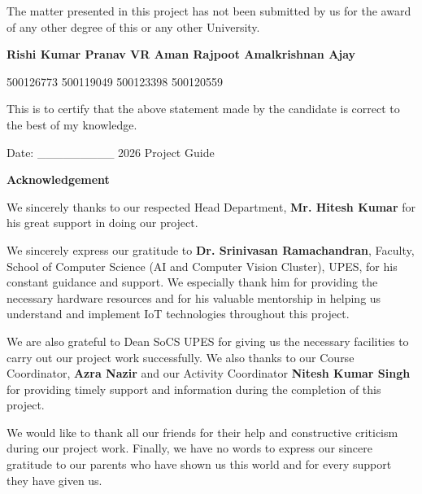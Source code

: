 The matter presented in this project has not been submitted by us for
the award of any other degree of this or any other University.

\textbf{Rishi Kumar Pranav VR Aman Rajpoot Amalkrishnan Ajay}

500126773 500119049 500123398 500120559

This is to certify that the above statement made by the candidate is
correct to the best of my knowledge.

Date: \_\_\_\_\_\_\_\_\_ 2026 Project Guide

\textbf{Acknowledgement}

We sincerely thanks to our respected Head Department, \textbf{Mr. Hitesh
Kumar} for his great support in doing our project.

We sincerely express our gratitude to \textbf{Dr. Srinivasan
Ramachandran}, Faculty, School of Computer Science (AI and Computer
Vision Cluster), UPES, for his constant guidance and support. We
especially thank him for providing the necessary hardware resources and
for his valuable mentorship in helping us understand and implement IoT
technologies throughout this project.

We are also grateful to Dean SoCS UPES for giving us the necessary
facilities to carry out our project work successfully. We also thanks to
our Course Coordinator, \textbf{Azra Nazir} and our Activity Coordinator
\textbf{Nitesh Kumar Singh} for providing timely support and information
during the completion of this project.

We would like to thank all our friends for their help and constructive
criticism during our project work. Finally, we have no words to express
our sincere gratitude to our parents who have shown us this world and
for every support they have given us.

